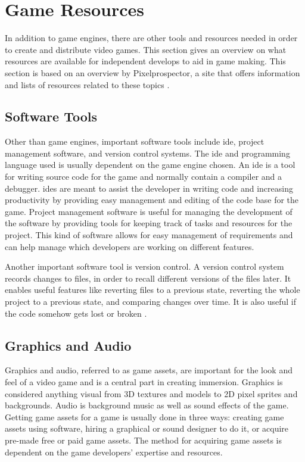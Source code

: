 \section{Game Resources}
In addition to game engines, there are other tools and resources needed in order to create and distribute video games. This section gives an overview on what resources are available for independent develops to aid in game making. This section is based on an overview by Pixelprospector, a site that offers information and lists of resources related to these topics \cite{pixel2016prospector}.

\subsection{Software Tools}
Other than game engines, important software tools include \gls{ide}, project management software, and version control systems. The \gls{ide} and programming language used is usually dependent on the game engine chosen. An \gls{ide} is a tool for writing source code for the game and normally contain a compiler and a debugger. \gls{ide}s are meant to assist the developer in writing code and increasing productivity by providing easy management and editing of the code base for the game. Project management software is useful for managing the development of the software by providing tools for keeping track of tasks and resources for the project. This kind of software allows for easy management of requirements and can help manage which developers are working on different features.

Another important software tool is version control. A version control system records changes to files, in order to recall different versions of the files later. It enables useful features like reverting files to a previous state, reverting the whole project to a previous state, and comparing changes over time. It is also useful if the code somehow gets lost or broken \cite{git2016vcs}.

\subsection{Graphics and Audio}
Graphics and audio, referred to as game assets, are important for the look and feel of a video game and is a central part in creating immersion. Graphics is considered anything visual from 3D textures and models to 2D pixel sprites and backgrounds. Audio is background music as well as sound effects of the game. Getting game assets for a game is usually done in three ways: creating game assets using software, hiring a graphical or sound designer to do it, or acquire pre-made free or paid game assets. The method for acquiring game assets is dependent on the game developers' expertise and resources.

